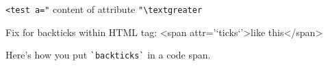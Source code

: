 \lstinline{<test a="} content of attribute \lstinline{"\textgreater}

Fix for backticks within HTML tag: <span attr='`ticks`'>like this</span>

Here's how you put \lstinline{`backticks`} in a code span.
